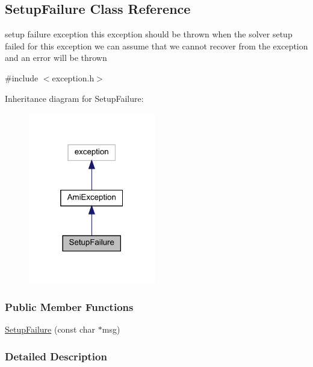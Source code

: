\hypertarget{classamici_1_1_setup_failure}{}\subsection{Setup\+Failure Class Reference}
\label{classamici_1_1_setup_failure}


setup failure exception this exception should be thrown when the solver setup failed for this exception we can assume that we cannot recover from the exception and an error will be thrown  




{\ttfamily \#include $<$exception.\+h$>$}



Inheritance diagram for Setup\+Failure\+:
\nopagebreak
\begin{figure}[H]
\begin{center}
\leavevmode
\includegraphics[width=157pt]{classamici_1_1_setup_failure__inherit__graph}
\end{center}
\end{figure}
\subsubsection*{Public Member Functions}
\begin{DoxyCompactItemize}
\item 
\mbox{\hyperlink{classamici_1_1_setup_failure_a86aa3460075a61cb0fe5f749bb1476f1}{Setup\+Failure}} (const char $\ast$msg)
\end{DoxyCompactItemize}


\subsubsection{Detailed Description}


